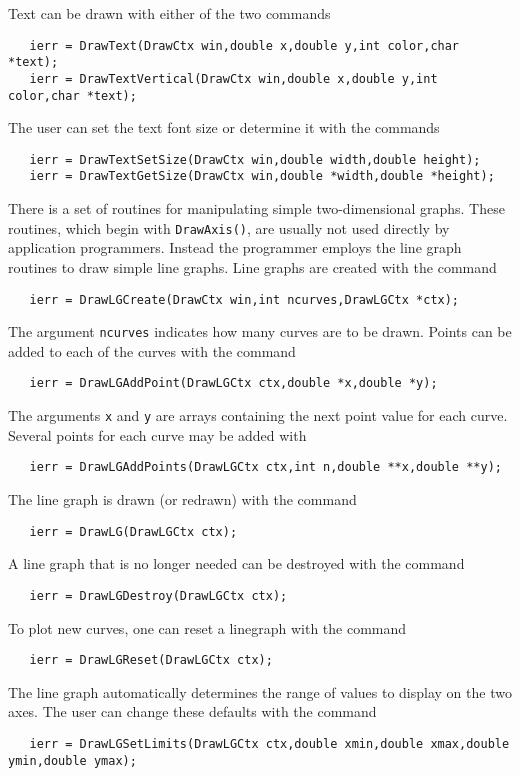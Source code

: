 Text can be drawn with either of the two 
commands  
\begin{verbatim}
   ierr = DrawText(DrawCtx win,double x,double y,int color,char *text);
   ierr = DrawTextVertical(DrawCtx win,double x,double y,int color,char *text);
\end{verbatim}
The user can set the text font size or determine it with the 
commands  
\begin{verbatim}
   ierr = DrawTextSetSize(DrawCtx win,double width,double height);
   ierr = DrawTextGetSize(DrawCtx win,double *width,double *height);
\end{verbatim}

There is a set of routines for manipulating simple two-dimensional
graphs. These routines, which begin with {\tt DrawAxis()}, are usually 
not used directly by application programmers.  Instead the programmer 
employs the line graph routines to draw simple line graphs.  Line graphs 
are created with the command  
\begin{verbatim}
   ierr = DrawLGCreate(DrawCtx win,int ncurves,DrawLGCtx *ctx);
\end{verbatim}
The argument {\tt ncurves} indicates how many curves are to be drawn.
Points can be added to each of the curves with the 
command 
\begin{verbatim}
   ierr = DrawLGAddPoint(DrawLGCtx ctx,double *x,double *y);
\end{verbatim}
The arguments {\tt x} and {\tt y} are arrays containing the next 
point value for each curve.
Several points for each curve may be added with 
\begin{verbatim}
   ierr = DrawLGAddPoints(DrawLGCtx ctx,int n,double **x,double **y);
\end{verbatim}

The line graph is drawn (or redrawn) with the command 
\begin{verbatim}
   ierr = DrawLG(DrawLGCtx ctx);
\end{verbatim}
A line graph that is no longer needed can be destroyed with the 
command 
\begin{verbatim}
   ierr = DrawLGDestroy(DrawLGCtx ctx);
\end{verbatim}
To plot new curves, one can reset a linegraph with the
command 
\begin{verbatim}
   ierr = DrawLGReset(DrawLGCtx ctx);
\end{verbatim}
The line graph automatically determines the range of values to 
display on the two axes.  The user can change these defaults with the 
command 
\begin{verbatim}
   ierr = DrawLGSetLimits(DrawLGCtx ctx,double xmin,double xmax,double ymin,double ymax);
\end{verbatim}

